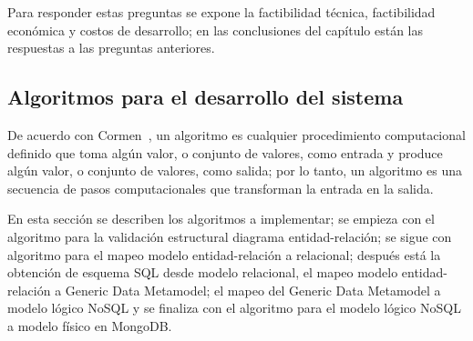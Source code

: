Para responder estas preguntas se expone la factibilidad técnica, factibilidad económica y costos de desarrollo; en las conclusiones del capítulo están las respuestas a las preguntas anteriores.




%

\subsection{Algoritmos para el desarrollo del sistema}

De acuerdo con Cormen~\cite{cormen_introduction_2009}, un algoritmo es cualquier procedimiento computacional definido que toma algún valor, o conjunto de valores, como entrada y produce algún valor, o conjunto de valores, como salida; por lo tanto, un algoritmo es una secuencia de pasos computacionales que transforman la entrada en la salida.


En esta sección se describen los algoritmos a implementar; se empieza con el algoritmo para la validación estructural diagrama entidad-relación; se sigue con algoritmo para el mapeo modelo entidad-relación a relacional; después está la obtención de esquema SQL desde modelo relacional, el mapeo modelo entidad-relación a Generic Data Metamodel; el mapeo del Generic Data Metamodel a modelo lógico NoSQL y se finaliza con el algoritmo para el modelo lógico NoSQL a modelo físico en MongoDB.





